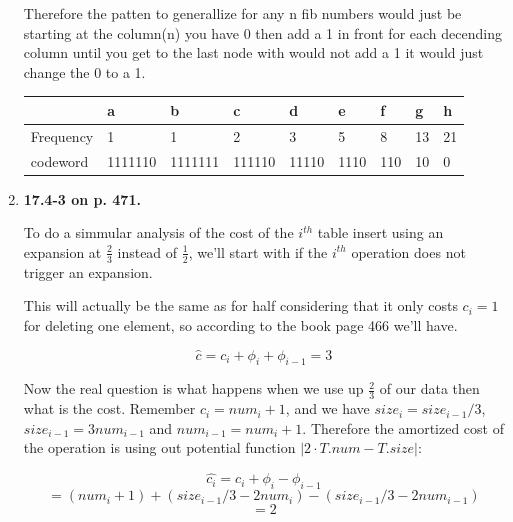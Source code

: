 \documentclass{article}
\begin{document}
\begin{enumerate}
    Therefore the patten to generallize for any n fib numbers would just be starting at the column(n) you have 0 then add a 1 in front for each decending column until you get to the last node with would not add a 1 it would just change the 0 to a 1.

    \begin{table}[H]
      \centering
      \begin{tabular}{|l|llllllll}
      \hline
                & \multicolumn{1}{l|}{a} & \multicolumn{1}{l|}{b} & \multicolumn{1}{l|}{c} & \multicolumn{1}{l|}{d} & \multicolumn{1}{l|}{e} & \multicolumn{1}{l|}{f} & \multicolumn{1}{l|}{g} & \multicolumn{1}{l|}{h} \\ \hline
      Frequency & 1                      & 1                      & 2                      & 3                      & 5                      & 8                      & 13                     & 21                     \\ \cline{1-1}
      codeword  & 1111110                & 1111111                & 111110                 & 11110                  & 1110                   & 110                    & 10                     & 0                      \\ \cline{1-1}
      \end{tabular}
      \end{table}

    \item \textbf{17.4-3 on p. 471.} 
    
    To do a simmular analysis of the cost of the $i^{th}$ table insert using an expansion at $\frac{2}{3}$ instead of $\frac{1}{2}$, we'll start with if the $i^{th}$ operation does not trigger an expansion.

    This will actually be the same as for half considering that it only costs $c_i = 1$ for deleting one element, so according to the book page 466 we'll have.

    \[\hat{c} = c_i + \phi_i + \phi_{i - 1} = 3\]

    Now the real question is what happens when we use up $\frac{2}{3}$ of our data then what is the cost. Remember $c_i = num_i + 1$, and we have $size_i = size_{i-1}/3$, $size_{i-1} = 3num_{i - 1}$ and  $num_{i-1} = num_i + 1$. 
    Therefore the amortized cost of the operation is using out potential function $|2 \cdot T.num - T.size|$:

    \[\hat{c_i} = c_i + \phi_i - \phi_{i-1}\]
    \[=(num_i + 1) + (size_{i-1}/3 - 2num_i) - (size_{i-1}/3 - 2num_{i-1}) \]
    \[= 2\]


\end{enumerate}
\end{document}
